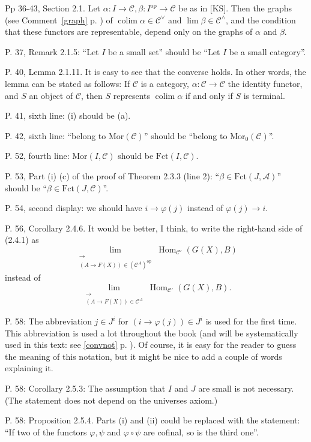 \documentclass[12pt]{article}
\theoremstyle{remark}
\newcommand{\n}{\noindent}
\newcommand{\A}{\mathcal A}
\newcommand{\C}{\mathcal C}
\newcommand{\op}{\text{op}}
\DeclareMathOperator*{\coli}{colim}
\DeclareMathOperator{\h}{Hom}
\begin{document}
\n Pp 36-43, Section 2.1. Let $\alpha:I\to\C,\beta:I^\op\to\C$ be as in [KS]. Then the graphs (see Comment~\ref{graph} p. \pageref{graph}) of $\coli\alpha\in\C^\vee$ and $\lim\beta\in\C^\wedge$, and the condition that these functors are representable, depend only on the graphs of $\alpha$ and $\beta$.

\n P. 37, Remark 2.1.5: ``Let $I$ be a small set'' should be ``Let $I$ be a small category''. 

\n P. 40, Lemma 2.1.11. It is easy to see that the converse holds. In other words, the lemma can be stated as follows: If $\C$ is a category, $\alpha:\C\to\C$ the identity functor, and $S$ an object of $\C$, then $S$ represents $\coli\alpha$ if and only if $S$ is terminal. 

\n P. 41, sixth line: (i) should be (a). 

\n P. 42, sixth line: ``belong to $\text{Mor}(\C)$'' should be ``belong to $\text{Mor}_0(\C)$''.

\n P. 52, fourth line: $\text{Mor}(I,\C)$ should be $\text{Fct}(I,\C)$. 

\n P. 53, Part (i) (c) of the proof of Theorem 2.3.3 (line 2): ``$\beta\in\text{Fct}(J,\A)$'' should be ``$\beta\in\text{Fct}(J,\C)$''.

\n P. 54, second display: we should have $i\to\varphi(j)$ instead of $\varphi(j)\to i$. 

\n P. 56, Corollary 2.4.6. It would be better, I think, to write the right-hand side of (2.4.1) as 
$$
\lim_{\substack{\longrightarrow\\ (A\to F(X))\in(\C^A)^\op}}\h_{\C'}(G(X),B)
$$ 
instead of 
$$ 
\lim_{\substack{\longrightarrow\\ (A\to F(X))\in\C^A}}\h_{\C'}(G(X),B). 
$$

\n P. 58: The abbreviation $j\in J^i$ for $(i\to\varphi(j))\in J^i$ is used for the first time. This abbreviation is used a lot throughout the book (and will be systematically used in this text: see \eqref{convnot} p. \pageref{convnot}). Of course, it is easy for the reader to guess the meaning of this notation, but it might be nice to add a couple of words explaining it. 

\n P. 58: Corollary 2.5.3: The assumption that $I$ and $J$ are small is not necessary. (The statement does not depend on the universes axiom.) 

\n P. 58: Proposition 2.5.4. Parts (i) and (ii) could be replaced with the statement: ``If two of the functors $\varphi,\psi$ and $\varphi\circ\psi$ are cofinal, so is the third one''.
\end{document}
